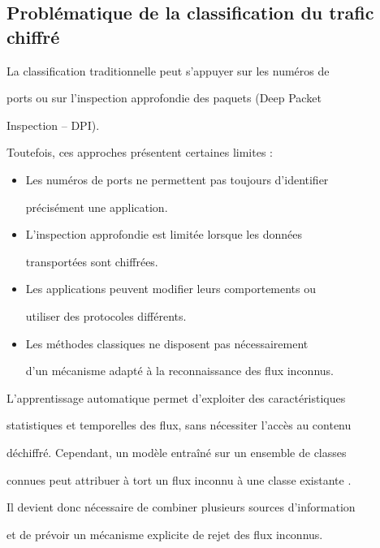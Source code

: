 \subsection{Problématique de la classification du trafic chiffré}



La classification traditionnelle peut s'appuyer sur les numéros de

ports ou sur l'inspection approfondie des paquets (Deep Packet

Inspection -- DPI).



Toutefois, ces approches présentent certaines limites :



\begin{itemize}

    \item Les numéros de ports ne permettent pas toujours d'identifier

    précisément une application.

    \item L'inspection approfondie est limitée lorsque les données

    transportées sont chiffrées.

    \item Les applications peuvent modifier leurs comportements ou

    utiliser des protocoles différents.

    \item Les méthodes classiques ne disposent pas nécessairement

    d'un mécanisme adapté à la reconnaissance des flux inconnus.

\end{itemize}



L'apprentissage automatique permet d'exploiter des caractéristiques

statistiques et temporelles des flux, sans nécessiter l'accès au contenu

déchiffré. Cependant, un modèle entraîné sur un ensemble de classes

connues peut attribuer à tort un flux inconnu à une classe existante \cite{drapergil2016,rezei2019}.



Il devient donc nécessaire de combiner plusieurs sources d'information

et de prévoir un mécanisme explicite de rejet des flux inconnus.



